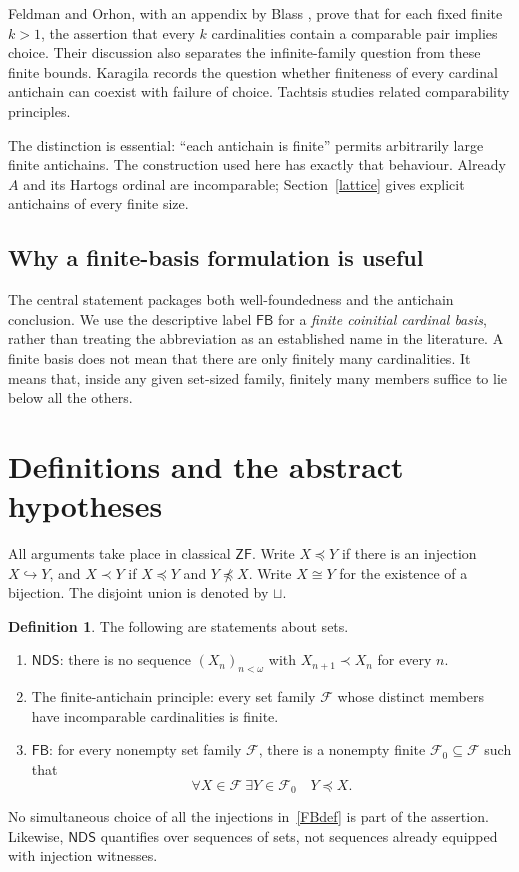 \documentclass[11pt,a4paper]{article}
\newcommand{\ZF}{\mathsf{ZF}}
\newcommand{\NDS}{\mathsf{NDS}}
\newcommand{\FB}{\mathsf{FB}}
\newcommand{\inj}{\hookrightarrow}
\theoremstyle{definition}
\newtheorem{definition}[theorem]{Definition}
\theoremstyle{remark}
\begin{document}
Feldman and Orhon, with an appendix by Blass \cite{FO}, prove that for each fixed finite $k>1$, the assertion that every $k$ cardinalities contain a comparable pair implies choice. Their discussion also separates the infinite-family question from these finite bounds. Karagila \cite[p.~144]{Karagila} records the question whether finiteness of every cardinal antichain can coexist with failure of choice. Tachtsis \cite{Tachtsis2018} studies related comparability principles.

The distinction is essential: ``each antichain is finite'' permits arbitrarily large finite antichains. The construction used here has exactly that behaviour. Already $A$ and its Hartogs ordinal are incomparable; Section~\ref{lattice} gives explicit antichains of every finite size.

\subsection{Why a finite-basis formulation is useful}
The central statement packages both well-foundedness and the antichain conclusion. We use the descriptive label $\FB$ for a \emph{finite coinitial cardinal basis}, rather than treating the abbreviation as an established name in the literature. A finite basis does not mean that there are only finitely many cardinalities. It means that, inside any given set-sized family, finitely many members suffice to lie below all the others.

\section{Definitions and the abstract hypotheses}\label{defs}

All arguments take place in classical $\ZF$. Write $X\preccurlyeq Y$ if there is an injection $X\inj Y$, and $X\prec Y$ if $X\preccurlyeq Y$ and $Y\not\preccurlyeq X$. Write $X\cong Y$ for the existence of a bijection. The disjoint union is denoted by $\sqcup$.

\begin{definition}
The following are statements about sets.
\begin{enumerate}[label=(\roman*)]
\item $\NDS$: there is no sequence $(X_n)_{n<\omega}$ with $X_{n+1}\prec X_n$ for every $n$.
\item The finite-antichain principle: every set family $\mathcal F$ whose distinct members have incomparable cardinalities is finite.
\item $\FB$: for every nonempty set family $\mathcal F$, there is a nonempty finite $\mathcal F_0\subseteq\mathcal F$ such that
\begin{equation}\label{FBdef}
 \forall X\in\mathcal F\ \exists Y\in\mathcal F_0\quad Y\preccurlyeq X.
\end{equation}
\end{enumerate}
No simultaneous choice of all the injections in~\eqref{FBdef} is part of the assertion. Likewise, $\NDS$ quantifies over sequences of sets, not sequences already equipped with injection witnesses.
\end{definition}
\end{document}
